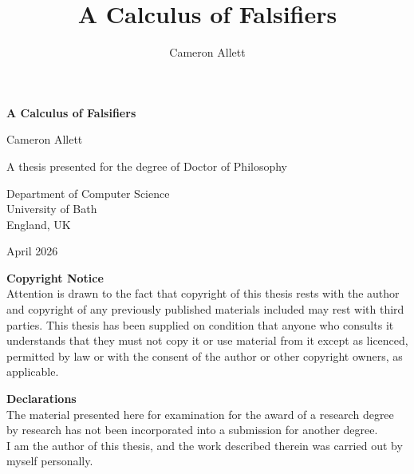 \documentclass[10pt]{article}
\title{A Calculus of Falsifiers}
\author{Cameron Allett}
\theoremstyle{definition}\newtheorem{remark}[theorem]{Remark}
\theoremstyle{definition}\newtheorem{example}[theorem]{Example}
\theoremstyle{definition}\newtheorem{definition}[theorem]{Definition}
\begin{document}
	\begin{titlepage}
		\begin{center}
			\vspace*{\fill}
			
			{\Huge\textbf{A Calculus of Falsifiers}}
			
			\vspace{1cm}
			
			{\LARGE Cameron Allett
			
			\vspace*{2cm}
			
			A thesis presented for the degree of Doctor of Philosophy
			
			\vspace{1cm}
			
			
			Department of Computer Science\\
			University of Bath\\
			England, UK\\
			
			\vspace{1cm}
			
			April 2026}
			
			\vspace*{\fill}
		\end{center}
	\end{titlepage}
	
	\pagebreak
	
	\begin{center}
		\textbf{Copyright Notice}
		\vspace{1em}
		\noindent
		\\ Attention is drawn to the fact that copyright of this thesis rests with the author and copyright of any previously published materials included may rest with third parties. This thesis has been supplied on condition that anyone who consults it understands that they must not copy it or use material from it except as licenced, permitted by law or with the consent of the author or other copyright owners, as applicable.
	
		\vspace{10em}
		
		\textbf{Declarations}
		\vspace{1em}
		\noindent
		\\ The material presented here for examination for the award of a research degree by research has not been incorporated into a submission for another degree.
		\vspace{1em}
		\noindent
		\\ I am the author of this thesis, and the work described therein was carried out by myself personally.
	\end{center}
	
\end{document}

